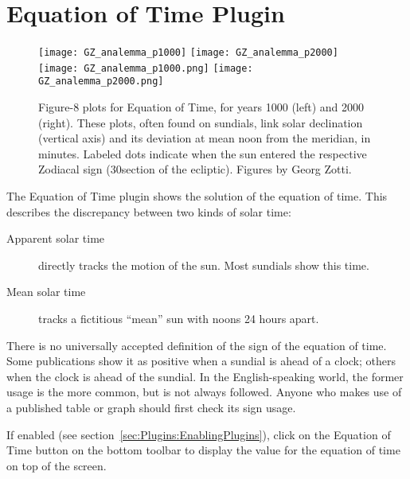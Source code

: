 \newpage
\section{Equation of Time Plugin}
\label{sec:plugins:EquationOfTime}


\begin{figure}[h]\centering
\ifpdf
\texttt{[image: GZ\_analemma\_p1000]}
\texttt{[image: GZ\_analemma\_p2000]}
\else
\texttt{[image: GZ\_analemma\_p1000.png]}
\texttt{[image: GZ\_analemma\_p2000.png]}
\fi
\caption{Figure-8 plots for Equation of Time, for years 1000 (left)
  and 2000 (right). These plots, often found on sundials, link solar
  declination (vertical axis) and its deviation at mean noon from the
  meridian, in minutes. Labeled dots indicate when the sun entered the
  respective Zodiacal sign (30\degree section of the
  ecliptic). Figures by Georg Zotti.}
\label{fig:EqOfTime}
\end{figure}


\noindent The Equation of Time plugin shows the solution of the equation of time. %
This describes the discrepancy between two kinds of
solar time:
\begin{description}
\item[Apparent solar time] directly tracks the motion of the sun. Most sundials show this time.
\item[Mean solar time] tracks a fictitious ``mean'' sun with noons 24 hours apart. 
\end{description}

There is no universally accepted definition of the sign of the
equation of time. Some publications show it as positive when a sundial
is ahead of a clock; others when the clock is ahead of the sundial. In
the English-speaking world, the former usage is the more common, but
is not always followed. Anyone who makes use of a published table or
graph should first check its sign usage.

If enabled (see section~\ref{sec:Plugins:EnablingPlugins}), click on
the Equation of Time button 
on the bottom toolbar to display the value for the equation of time on
top of the screen.


